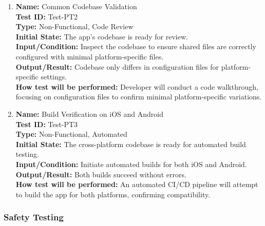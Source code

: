 \documentclass[12pt, titlepage]{article}
\begin{document}
\begin{enumerate}
\begin{enumerate}
    \item \textbf{Name:} Common Codebase Validation \label{itm:Test-PT2} \\
    \textbf{Test ID:} Test-PT2 \\
    \textbf{Type:} Non-Functional, Code Review \\
    \textbf{Initial State:} The app’s codebase is ready for review. \\
    \textbf{Input/Condition:} Inspect the codebase to ensure shared files are correctly configured with minimal platform-specific files. \\
    \textbf{Output/Result:} Codebase only differs in configuration files for platform-specific settings. \\
    \textbf{How test will be performed:} Developer will conduct a code walkthrough, focusing on configuration files to confirm minimal platform-specific variations.

    \item \textbf{Name:} Build Verification on iOS and Android \label{itm:Test-PT3} \\
    \textbf{Test ID:} Test-PT3 \\
    \textbf{Type:} Non-Functional, Automated \\
    \textbf{Initial State:} The cross-platform codebase is ready for automated build testing. \\
    \textbf{Input/Condition:} Initiate automated builds for both iOS and Android. \\
    \textbf{Output/Result:} Both builds succeed without errors. \\
    \textbf{How test will be performed:} An automated CI/CD pipeline will attempt to build the app for both platforms, confirming compatibility.

\end{enumerate}


\subsubsection{Safety Testing}

\begin{enumerate}


\end{enumerate}
\end{enumerate}
\end{document}
